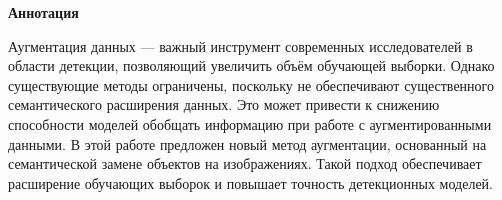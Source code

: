 \begin{center}
    \Large{\textbf{Аннотация}}
\end{center}
Аугментация данных — важный инструмент современных исследователей в области детекции, позволяющий увеличить объём обучающей выборки. Однако существующие методы ограничены, поскольку не обеспечивают существенного семантического расширения данных. Это может привести к снижению способности моделей обобщать информацию при работе с аугментированными данными. В этой работе предложен новый метод аугментации, основанный на семантической замене объектов на изображениях. Такой подход обеспечивает расширение обучающих выборок и повышает точность детекционных моделей.

